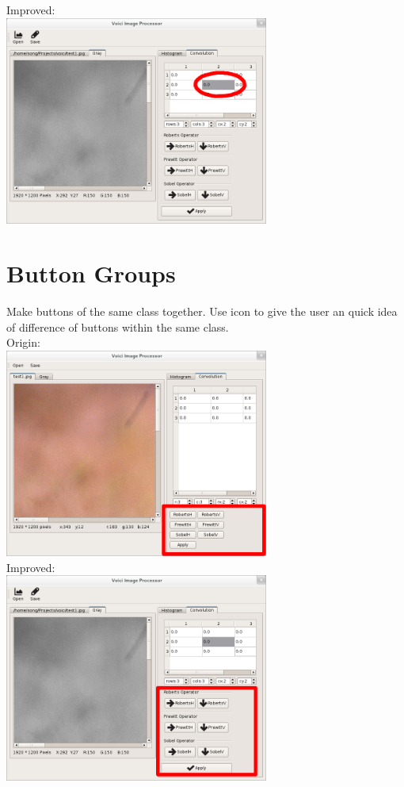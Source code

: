 \documentclass[10pt,a4paper]{article}
\begin{document}
Improved:\\
\indent\includegraphics[width=0.65\textwidth]{item_improved.png}

\pagebreak

\section{Button Groups}
Make buttons of the same class together. Use icon to give the user an quick idea of difference of buttons within the same class.\\

Origin:\\
\indent\includegraphics[width=0.65\textwidth]{icon_and_group_origin.png}\\

Improved:\\
\indent\includegraphics[width=0.65\textwidth]{icon_and_group_improved.png}
\end{document}
